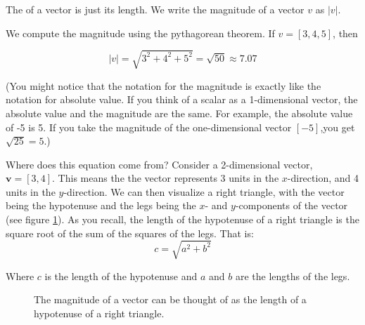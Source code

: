 The  of a vector is just its length. We write the 
magnitude of a vector $v$ as $|v|$.

We compute the magnitude using the pythagorean theorem.  If $v = [3,4,5]$, 
then

\begin{equation*}
    |v| = \sqrt{3^2 + 4^2 + 5^2} = \sqrt{50} \approx 7.07
\end{equation*}

(You might notice that the notation for the magnitude is exactly like the 
notation for absolute value. If you think of a scalar as a 1-dimensional 
vector, the absolute value and the magnitude are the same. For example, the 
absolute value of -5 is 5.  If you take the magnitude of the one-dimensional 
vector $[-5]$,you get $\sqrt{25} = 5$.)

Where does this equation come from? Consider a 2-dimensional vector, 
$\textbf{v} = \left[ 3, 4 \right]$. This means the the vector represents 3 
units in the $x$-direction, and 4 units in the $y$-direction. We can then 
visualize a right triangle, with the vector being the hypotenuse and the legs 
being the $x$- and $y$-components of the vector (see figure 
\ref{fig:triangle}). As you recall, the length of the hypotenuse of a right 
triangle is the square root of the sum of the squares of the legs. That is:
$$c = \sqrt{a^2 + b^2}$$

Where $c$ is the length of the hypotenuse and $a$ and $b$ are the lengths of 
the legs. 

\begin{figure}
    \centering
    \caption{The magnitude of a vector can be thought of as the length of a 
    hypotenuse of a right triangle.}
    \label{fig:triangle}
\end{figure}


